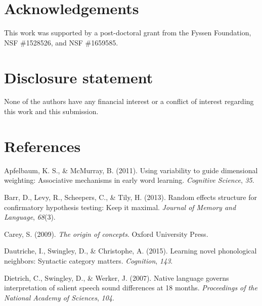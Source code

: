 \documentclass[english,,man,floatsintext]{apa6}
\theoremstyle{definition}
\theoremstyle{definition}
\theoremstyle{definition}
\theoremstyle{remark}
\begin{document}
\vspace{1em}

\vspace{1em}

\section{Acknowledgements}\label{acknowledgements}

This work was supported by a post-doctoral grant from the Fyssen
Foundation, NSF \#1528526, and NSF \#1659585.

\section{Disclosure statement}\label{disclosure-statement}

None of the authors have any financial interest or a conflict of
interest regarding this work and this submission.

\section{References}\label{references}

\setlength{\parindent}{-0.5in} \setlength{\leftskip}{0.5in}

\hypertarget{refs}{}
\hypertarget{ref-apfelbaum2011}{}
Apfelbaum, K. S., \& McMurray, B. (2011). Using variability to guide
dimensional weighting: Associative mechanisms in early word learning.
\emph{Cognitive Science}, \emph{35}.

\hypertarget{ref-barr2013}{}
Barr, D., Levy, R., Scheepers, C., \& Tily, H. (2013). Random effects
structure for confirmatory hypothesis testing: Keep it maximal.
\emph{Journal of Memory and Language}, \emph{68}(3).

\hypertarget{ref-carey2009}{}
Carey, S. (2009). \emph{The origin of concepts}. Oxford University
Press.

\hypertarget{ref-dautriche2015}{}
Dautriche, I., Swingley, D., \& Christophe, A. (2015). Learning novel
phonological neighbors: Syntactic category matters. \emph{Cognition},
\emph{143}.

\hypertarget{ref-dietrich2007}{}
Dietrich, C., Swingley, D., \& Werker, J. (2007). Native language
governs interpretation of salient speech sound differences at 18 months.
\emph{Proceedings of the National Academy of Sciences}, \emph{104}.
\end{document}
